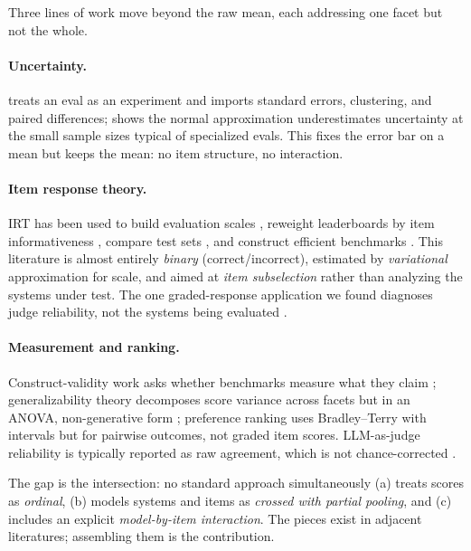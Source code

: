 \documentclass{llncs}
\begin{document}
Three lines of work move beyond the raw mean, each addressing one facet but
not the whole.

\paragraph{Uncertainty.} \textcite{miller2024errorbars} treats an eval as an
experiment and imports standard errors, clustering, and paired differences;
\textcite{bowyer2025clt} shows the normal approximation underestimates
uncertainty at the small sample sizes typical of specialized evals. This
fixes the error bar on a mean but keeps the mean: no item structure, no
interaction.

\paragraph{Item response theory.} IRT has been used to build evaluation
scales \parencite{lalor2016irt}, reweight leaderboards by item
informativeness \parencite{rodriguez2021leaderboards}, compare test sets
\parencite{vania2021testsets}, and construct efficient benchmarks
\parencite{polo2024tinybenchmarks}. This literature is almost entirely
\emph{binary} (correct/incorrect), estimated by \emph{variational}
approximation for scale, and aimed at \emph{item subselection} rather than
analyzing the systems under test. The one graded-response application we
found diagnoses judge reliability, not the systems being evaluated
\parencite{choi2026judgeirt}.

\paragraph{Measurement and ranking.} Construct-validity work asks whether
benchmarks measure what they claim \parencite{bean2025construct};
generalizability theory decomposes score variance across facets but in an
ANOVA, non-generative form \parencite{song2025gtheory}; preference ranking
uses Bradley--Terry with intervals \parencite{chiang2024arena} but for
pairwise outcomes, not graded item scores. LLM-as-judge reliability is
typically reported as raw agreement, which is not chance-corrected
\parencite{zheng2023judge}.

The gap is the intersection: no standard approach simultaneously (a) treats
scores as \emph{ordinal}, (b) models systems and items as \emph{crossed with
partial pooling}, and (c) includes an explicit \emph{model-by-item
interaction}. The pieces exist in adjacent literatures; assembling them is
the contribution.
\end{document}
